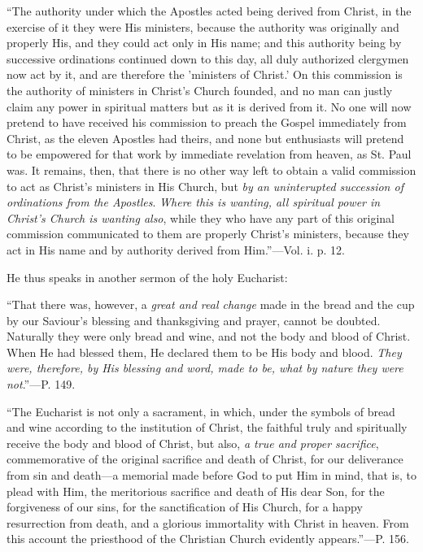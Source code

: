 ``The
authority under which the Apostles acted being derived from Christ, in
the exercise of it they were His ministers, because the authority was
originally and properly His, and they could act only in His name; and
this authority being by successive ordinations continued down to this
day, all duly authorized clergymen now act by it, and are therefore
the 'ministers of Christ.' On this commission is the authority of
ministers in Christ's Church founded, and no man can justly claim any
power in spiritual matters but as it is derived from it. No one will
now pretend to have received his commission to preach the Gospel
immediately from Christ, as the eleven Apostles had theirs, and none
but enthusiasts will pretend to be empowered for that work by
immediate revelation from heaven, as St. Paul was. It remains, then,
that there is no other way left to obtain a valid commission to act as
Christ's ministers in His Church, but \emph{by an uninterupted succession
of ordinations from the Apostles}. \emph{Where this is wanting, all
spiritual power in Christ's Church is wanting also}, while they who
have any part of this original commission communicated to them are
properly Christ's ministers, because they act in His name and by
authority derived from Him.''—Vol. i. p. 12.

He thus speaks in another sermon of the holy
Eucharist:

``That there
was, however, a \emph{great and real change} made in the bread and the
cup by our Saviour's blessing and thanksgiving and prayer, cannot be doubted. Naturally they were only bread and wine, and
not the body and blood of Christ. When He had blessed them, He
declared them to be His body and blood. \emph{They were, therefore, by
His blessing and word, made to be, what by nature they were not}.''—P.
149.

``The
Eucharist is not only a sacrament, in which, under the symbols of
bread and wine according to the institution of Christ, the faithful
truly and spiritually receive the body and blood of Christ, but also, \emph{a
true and proper sacrifice}, commemorative of the original sacrifice
and death of Christ, for our deliverance from sin and death—a
memorial made before God to put Him in mind, that is, to plead with
Him, the meritorious sacrifice and death of His dear Son, for the
forgiveness of our sins, for the sanctification of His Church, for a
happy resurrection from death, and a glorious immortality with Christ
in heaven. From this account the priesthood of the Christian Church
evidently appears.''—P. 156.

